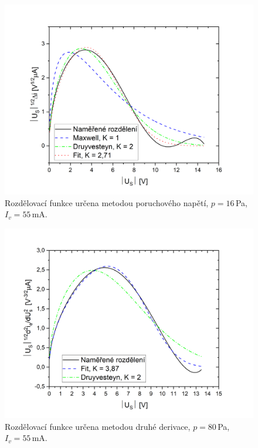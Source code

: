 \documentclass[a4paper,12pt]{article}
\begin{document}
\begin{figure}[h!]
	\centering
	\includegraphics[width=135mm]{rozdeleniG3.png}
	\caption{Rozdělovací funkce určena metodou poruchového napětí, 
	$p=16$\,\si{\pascal}, $I_v = 55$\,\si{\milli\ampere}.}
	\label{rozdeleniG3}
\end{figure}

\begin{figure}[h!]
	\centering
	\includegraphics[width=135mm]{rozdeleniD2G1V2.png}
	\caption{Rozdělovací funkce určena metodou druhé derivace, 
		$p=80$\,\si{\pascal}, $I_v = 55$\,\si{\milli\ampere}.}
	\label{rozdeleniD2G1}
\end{figure}
\end{document}
